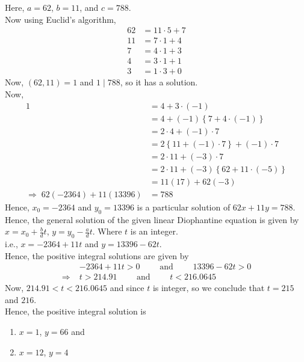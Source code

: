 \documentclass[12pt]{book}
\begin{document}
\begin{soln}
    Here, $ a=62 $, $ b=11 $, and $ c=788 $.\\
    Now using Euclid's algorithm,
    \begin{align*}
        62&=11\cdot 5+7\\
        11&=7\cdot 1+4\\
        7&=4\cdot 1+3\\
        4&=3\cdot 1+1\\
        3&=1\cdot 3+0
    \end{align*}
    Now, $ (62,11)=1 $ and $ 1\mid 788 $, so it has a solution.\\
    Now, 
    \begin{align*}
        1&= 4+3\cdot(-1)\\
        &= 4+(-1)\left\{ 7+4\cdot(-1) \right\}\\
        &= 2\cdot4+(-1)\cdot7\\
        &= 2\left\{ 11+(-1)\cdot7 \right\}+(-1)\cdot7\\
        &= 2\cdot 11+(-3)\cdot7 \\
        &= 2\cdot 11+(-3)\left\{ 62+11\cdot(-5) \right\} \\
        &= 11(17)+62(-3)\\
        \Rightarrow\; 62(-2364)+11(13396)&= 788
    \end{align*}
    Hence, $ x_0=-2364 $ and $ y_0=13396 $ is a particular solution of $ 62x+11y=788 $.\\
    Hence, the general solution of the given linear Diophantine equation is given by $ x=x_0+\frac{b}{d}t $, $ y=y_0-\frac{a}{d}t $. Where $ t $ is an integer.\\
    i.e., $ x=-2364+11t $ and $ y=13396-62t $.\\
    Hence, the positive integral solutions are given by 
    \begin{align*}
        &-2364+11t>0 \qquad\text{ and } \qquad 13396-62t>0\\
        \Rightarrow\;&t>214.91 \qquad\text{ and } \qquad t<216.0645 
    \end{align*}
    Now, $ 214.91<t<216.0645 $ and since $ t $ is integer, so we conclude that $ t=215 $ and $ 216 $.\\
    Hence, the positive integral solution is 
    \begin{enumerate}[label=(\roman*)]
        \item $ x=1 $, $ y=66 $  and
        \item $ x=12 $, $ y=4 $
    \end{enumerate}
\end{soln}
\end{document}

